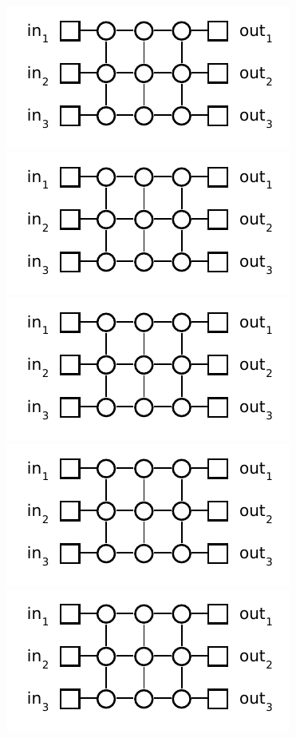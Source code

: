 \documentclass[12pt,oneside]{article}
\begin{document}
\begin{problem}{18}
\begin{figure}[h!]
\begin{center}
    \includegraphics{3x3grid.pdf} \quad \\[1.5em]
    \includegraphics{3x3grid.pdf} \quad
    \includegraphics{3x3grid.pdf} \quad \\[1.5em]
    \includegraphics{3x3grid.pdf} \quad
    \includegraphics{3x3grid.pdf} \quad \\[1.5em]

\end{center}
\end{figure}
\end{problem}
\end{document}
